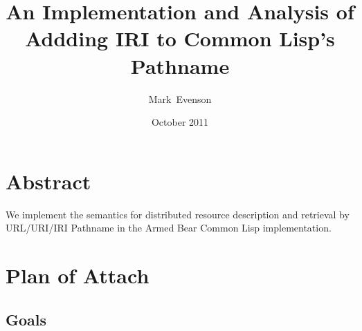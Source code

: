 \documentclass[10pt]{article}
\begin{document}
\title{An Implementation and Analysis of Addding IRI to Common Lisp's Pathname}
\date{October 2011}
\author{Mark~Evenson}

\maketitle

\section{Abstract}

We implement the semantics for distributed resource description and
retrieval by URL/URI/IRI Pathname in the Armed Bear Common Lisp
implementation.

\section{Plan of Attach}
\subsection{Goals}
\end{document}
